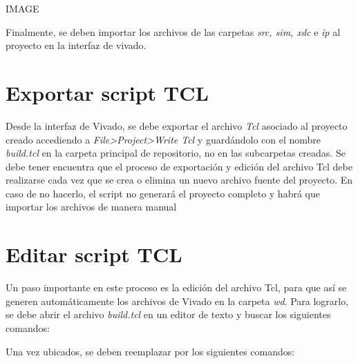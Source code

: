 {{IMAGE

Finalmente, se deben importar los archivos de las carpetas \textit{src, sim, xdc} e \textit{ip} al proyecto en la interfaz de vivado.

\section{Exportar script TCL}

Desde la interfaz de Vivado, se debe exportar el archivo \textit{Tcl} asociado al proyecto creado accediendo a \textit{File>Project>Write Tcl} y guardándolo con el nombre \textit{build.tcl} en la carpeta principal de repositorio, no en las subcarpetas creadas. Se debe tener encuentra que el proceso de exportación y edición del archivo Tcl debe realizarse cada vez que se crea o elimina un nuevo archivo fuente del proyecto. En caso de no hacerlo, el script no generará el proyecto completo y habrá que importar los archivos de manera manual

\section{Editar script TCL}
Un paso importante en este proceso es la edición del archivo Tcl, para que así se generen automáticamente los archivos de Vivado en la carpeta \textit{wd}. Para lograrlo, se debe abrir el archivo \textit{build.tcl} en un editor de texto y buscar los siguientes comandos:

%
%

Una vez ubicados, se deben reemplazar por los siguientes comandos:
%
%

}}
